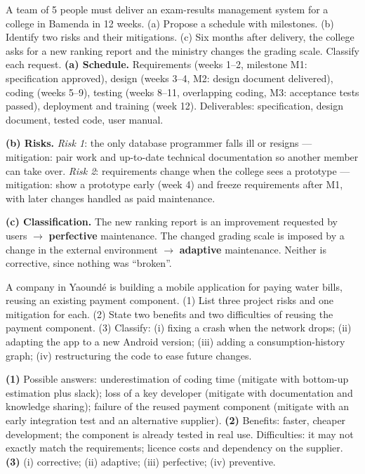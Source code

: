 \documentclass[11pt]{article}
\begin{document}
\begin{exoresolu}
A team of 5 people must deliver an exam-results management system for a college in Bamenda in 12 weeks. (a) Propose a schedule with milestones. (b) Identify two risks and their mitigations. (c) Six months after delivery, the college asks for a new ranking report and the ministry changes the grading scale. Classify each request.
\tcblower
\textbf{(a) Schedule.} Requirements (weeks 1--2, milestone M1: specification approved), design (weeks 3--4, M2: design document delivered), coding (weeks 5--9), testing (weeks 8--11, overlapping coding, M3: acceptance tests passed), deployment and training (week 12). Deliverables: specification, design document, tested code, user manual.

\textbf{(b) Risks.} \emph{Risk 1}: the only database programmer falls ill or resigns — mitigation: pair work and up-to-date technical documentation so another member can take over. \emph{Risk 2}: requirements change when the college sees a prototype — mitigation: show a prototype early (week 4) and freeze requirements after M1, with later changes handled as paid maintenance.

\textbf{(c) Classification.} The new ranking report is an improvement requested by users $\rightarrow$ \textbf{perfective} maintenance. The changed grading scale is imposed by a change in the external environment $\rightarrow$ \textbf{adaptive} maintenance. Neither is corrective, since nothing was ``broken''.
\end{exoresolu}

\begin{exercice}
A company in Yaound\'e is building a mobile application for paying water bills, reusing an existing payment component. (1) List three project risks and one mitigation for each. (2) State two benefits and two difficulties of reusing the payment component. (3) Classify: (i) fixing a crash when the network drops; (ii) adapting the app to a new Android version; (iii) adding a consumption-history graph; (iv) restructuring the code to ease future changes.
\end{exercice}

\begin{corrige}[Exercise 1]
\textbf{(1)} Possible answers: underestimation of coding time (mitigate with bottom-up estimation plus slack); loss of a key developer (mitigate with documentation and knowledge sharing); failure of the reused payment component (mitigate with an early integration test and an alternative supplier).
\textbf{(2)} Benefits: faster, cheaper development; the component is already tested in real use. Difficulties: it may not exactly match the requirements; licence costs and dependency on the supplier.
\textbf{(3)} (i) corrective; (ii) adaptive; (iii) perfective; (iv) preventive.
\end{corrige}
\end{document}
